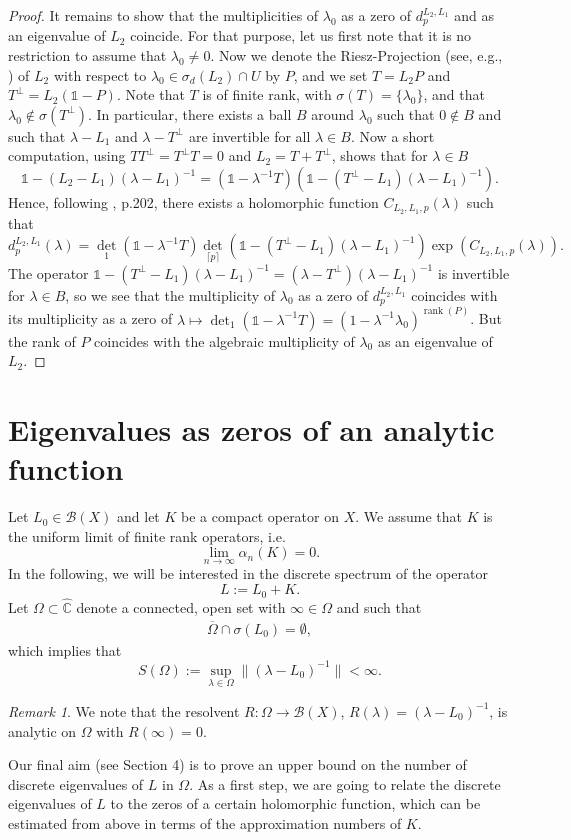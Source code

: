 \documentclass[12pt,a4paper]{article}
\theoremstyle{definition}
\theoremstyle{remark}
\newtheorem {rem}[theorem]{Remark}
\numberwithin{equation}{section}
\newcommand{\mc}{{\mathbb C}}
\newcommand{\bdd}{\mathcal{B}}
\newcommand{\rank}{\operatorname{rank}}
\begin{document}
\begin{proof}
 It remains to show that the multiplicities of $\lambda_0$ as a zero of $d_{p}^{L_2,L_1}$ and as an eigenvalue of $L_2$ coincide. For that purpose, let us first note that it is no restriction to assume that $\lambda_0 \neq 0$. Now we denote the Riesz-Projection (see, e.g., \cite{gohberg1}) of $L_2$ with respect to $\lambda_0 \in \sigma_d(L_2) \cap U$ by $P$, and we set $T=L_2P$ and $T^\perp=L_2(\mathds{1}-P)$. Note that $T$ is of finite rank, with $\sigma(T)=\{\lambda_0\}$, and that $\lambda_0 \notin \sigma(T^\perp)$. In particular, there exists a ball $B$ around $\lambda_0$ such that $0 \notin B$ and such that $\lambda-L_1$ and $\lambda-T^\perp$ are invertible for all $\lambda \in B$. Now a short computation, using $TT^\perp=T^\perp T=0$ and $L_2=T+T^\perp$, shows that for $\lambda \in B$
$$ \mathds{1}-(L_2-L_1)(\lambda-L_1)^{-1} = (\mathds{1}-\lambda^{-1}T)(\mathds{1}-(T^\perp-L_1)(\lambda-L_1)^{-1}).$$
Hence, following \cite{MR1744872}, p.202, there exists a holomorphic function $C_{L_2,L_1,p}(\lambda)$ such that 
$$ d_{p}^{L_2,L_1}(\lambda) = {\det}_{1}(\mathds{1}-\lambda^{-1}T){\det}_{\lceil p \rceil}(\mathds{1}-(T^\perp-L_1)(\lambda-L_1)^{-1})\exp(C_{L_2,L_1,p}(\lambda)).$$
The operator $\mathds{1}-(T^\perp-L_1)(\lambda-L_1)^{-1}=(\lambda-T^\perp)(\lambda-L_1)^{-1}$ is invertible for $\lambda \in B$, so we see that the multiplicity of $\lambda_0$ as a zero of $d_{p}^{L_2,L_1}$ coincides with its multiplicity as a zero of $\lambda \mapsto {\det}_{1}(\mathds{1}-\lambda^{-1}T) = (1-\lambda^{-1}\lambda_0)^{\rank(P)}$. 
But the rank of $P$ coincides with the algebraic multiplicity of $\lambda_0$ as an eigenvalue of $L_2$.
\end{proof}

\section{Eigenvalues as zeros of an analytic function} 

Let $L_0 \in \bdd(X)$ and let $K$ be a compact operator on $X$. We assume that $K$ is the uniform limit of finite rank operators, i.e. 
\[ \lim_{n\rightarrow \infty}\alpha_n(K)=0.\]
In the following, we will be interested in the discrete spectrum of the operator 
\[ L:=L_0+K.\]
Let $\Omega \subset \hat{\mc}$ denote a connected, open set with $\infty \in \Omega$ and such that 
\begin{align}
\overline{\Omega}\cap \sigma(L_0)=\emptyset,\label{eq1.1a}
\end{align}
which implies that 
\[ S(\Omega):=\sup_{\lambda\in \Omega}\|(\lambda-L_0)^{-1}\|< \infty.\]
\begin{rem}
We note that the resolvent $R: \Omega \to \bdd(X)$, $R(\lambda)= (\lambda-L_0)^{-1}$, is analytic on $\Omega$ with $R(\infty)=0$.
\end{rem} 
Our final aim (see Section 4) is to prove an upper bound on the number of discrete eigenvalues of $L$ in $\Omega$. As a first step, we are going to relate the discrete eigenvalues of $L$ to the zeros of a certain holomorphic function, which can be estimated from above in terms of the approximation numbers of $K$. 
\end{document}
